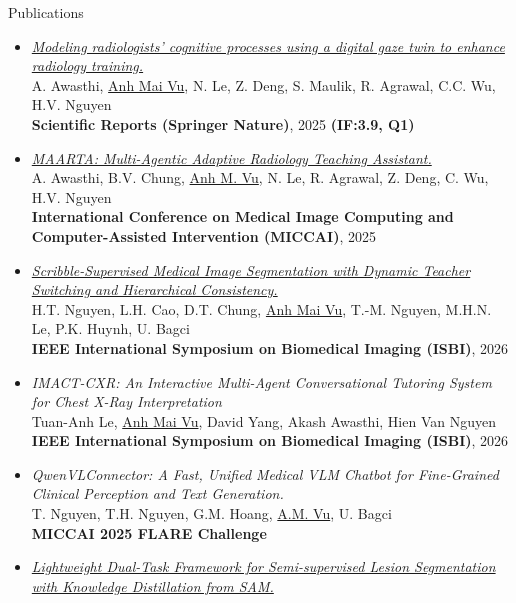 \documentclass[11pt]{resume}
\newcommand{\ptitle}[1]{{\fontsize{10.5}{12}\selectfont \textit{#1}}}
\newcommand{\ptitleb}[1]{{\fontsize{9}{10.5}\selectfont \textbf{#1}}}
\begin{document}
\begin{rSection}{Publications}
\begin{itemize}
          \ptitleb{Knowledge-Based Systems (Elsevier)}, 2025 \textbf{(IF: 7.6, Q1)}
   \item \href{https://www.nature.com/articles/s41598-025-97935-y}{\ptitle{Modeling radiologists' cognitive processes using a digital gaze twin to enhance radiology training.}} \\
          A. Awasthi, \underline{Anh Mai Vu}, N. Le, Z. Deng, S. Maulik, R. Agrawal, C.C. Wu, H.V. Nguyen \\
          \ptitleb{Scientific Reports (Springer Nature)}, 2025 \textbf{(IF:3.9, Q1)}
    \item \href{https://link.springer.com/chapter/10.1007/978-3-032-04971-1_34}{\ptitle{MAARTA: Multi-Agentic Adaptive Radiology Teaching Assistant.}} \\
          A. Awasthi, B.V. Chung, \underline{Anh M. Vu}, N. Le, R. Agrawal, Z. Deng, C. Wu, H.V. Nguyen \\
          \ptitleb{International Conference on Medical Image Computing and Computer-Assisted Intervention (MICCAI)}, 2025
    \item \href{https://arxiv.org/pdf/2601.14563}{\ptitle{Scribble-Supervised Medical Image Segmentation with Dynamic Teacher Switching and Hierarchical Consistency.}} \\
    H.T. Nguyen, L.H. Cao, D.T. Chung, \underline{Anh Mai Vu}, T.-M. Nguyen, M.H.N. Le, P.K. Huynh, U. Bagci \\
    \ptitleb{IEEE International Symposium on Biomedical Imaging (ISBI)}, 2026
    \item \ptitle{IMACT-CXR: An Interactive Multi-Agent Conversational Tutoring System for Chest X-Ray Interpretation} \\
      Tuan-Anh Le, \underline{Anh Mai Vu}, David Yang, Akash Awasthi, Hien Van Nguyen \\
      \ptitleb{IEEE International Symposium on Biomedical Imaging (ISBI)}, 2026
    \item \ptitle{QwenVLConnector: A Fast, Unified Medical VLM Chatbot for Fine-Grained Clinical Perception and Text Generation.} \\
          T. Nguyen, T.H. Nguyen, G.M. Hoang, \underline{A.M. Vu}, U. Bagci \\
          \ptitleb{MICCAI 2025 FLARE Challenge}
    \item \href{https://link.springer.com/chapter/10.1007/978-3-032-05825-6_6}{\ptitle{Lightweight Dual-Task Framework for Semi-supervised Lesion Segmentation with Knowledge Distillation from SAM.}} \\

\end{itemize}
\end{rSection}
\end{document}
